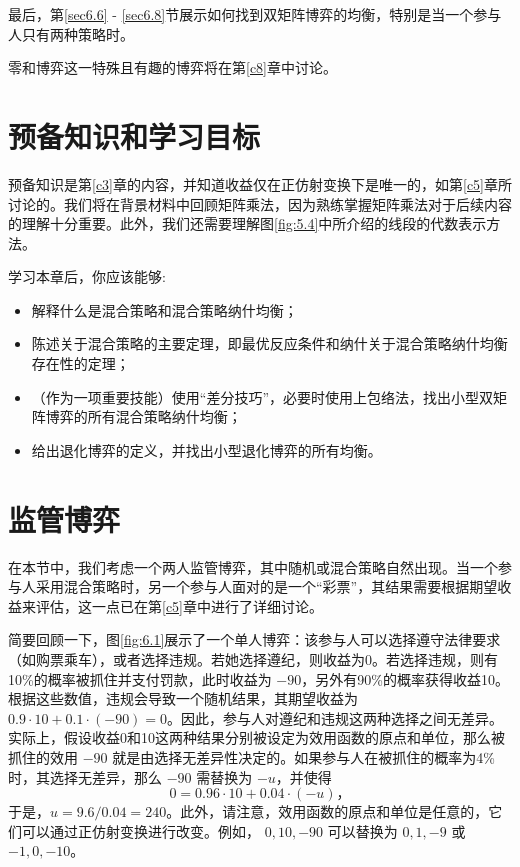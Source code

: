 最后，第\ref{sec6.6} - \ref{sec6.8}节展示如何找到双矩阵博弈的均衡，特别是当一个参与人只有两种策略时。

零和博弈这一特殊且有趣的博弈将在第\ref{c8}章中讨论。

\section{预备知识和学习目标}  \label{sec6.1}

预备知识是第\ref{c3}章的内容，并知道收益仅在正仿射变换下是唯一的，如第\ref{c5}章所讨论的。我们将在背景材料中回顾矩阵乘法，因为熟练掌握矩阵乘法对于后续内容的理解十分重要。此外，我们还需要理解图\ref{fig:5.4}中所介绍的线段的代数表示方法。

学习本章后，你应该能够:
\begin{itemize}
\item 解释什么是混合策略和混合策略纳什均衡；

\item 陈述关于混合策略的主要定理，即最优反应条件和纳什关于混合策略纳什均衡存在性的定理；

\item （作为一项重要技能）使用“差分技巧”，必要时使用上包络法，找出小型双矩阵博弈的所有混合策略纳什均衡；

\item 给出退化博弈的定义，并找出小型退化博弈的所有均衡。
\end{itemize}

\section{监管博弈}  \label{sec6.2}

在本节中，我们考虑一个两人监管博弈，其中随机或混合策略自然出现。当一个参与人采用混合策略时，另一个参与人面对的是一个“彩票”，其结果需要根据期望收益来评估，这一点已在第\ref{c5}章中进行了详细讨论。

简要回顾一下，图\ref{fig:6.1}展示了一个单人博弈：该参与人可以选择遵守法律要求（如购票乘车），或者选择违规。若她选择遵纪，则收益为0。若选择违规，则有10\%的概率被抓住并支付罚款，此时收益为 $-90$，另外有90\%的概率获得收益10。根据这些数值，违规会导致一个随机结果，其期望收益为 \({0.9} \cdot  {10} + {0.1} \cdot  \left( {-{90}}\right)=0\)。因此，参与人对遵纪和违规这两种选择之间无差异。实际上，假设收益0和10这两种结果分别被设定为效用函数的原点和单位，那么被抓住的效用 $-90$ 就是由选择无差异性决定的。如果参与人在被抓住的概率为4\%时，其选择无差异，那么 $-90$ 需替换为 \(- u\)，并使得
\[
0 = {0.96} \cdot  {10} + {0.04} \cdot  \left( {-u}\right)，
\]
于是，\(u = {9.6}/{0.04} = {240}\)。此外，请注意，效用函数的原点和单位是任意的，它们可以通过正仿射变换进行改变。例如， \(0,{10}, - {90}\) 可以替换为 \(0,1, - 9\) 或 \(- 1,0, - {10}\)。

